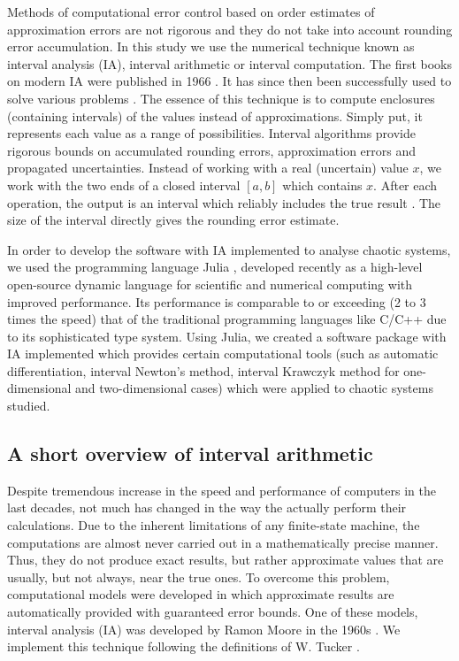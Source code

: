 \documentclass[pre, amsmath, amssymb, onecolumn, showpacs]{revtex4-1}
\begin{document}
Methods of computational error control based on order estimates of approximation errors are not rigorous and they do not take into account rounding error accumulation. In this study we use the numerical technique known as interval analysis (IA), interval arithmetic or interval computation. The first books on modern IA were published in 1966 \cite{moore1966interval, moore2009introduction}. It has since then been successfully used to solve various problems \cite{zuhe1990solving, schichl2005interval}. The essence of this technique is to compute enclosures (containing intervals) of the values instead of approximations. Simply put, it represents each value as a range of possibilities. Interval algorithms provide rigorous bounds on accumulated rounding errors, approximation errors and propagated uncertainties. Instead of working with a real (uncertain) value $x$, we work with the two ends of a closed interval $[a, b]$ which contains $x$. After each operation, the output is an interval which reliably includes the true result \cite{tucker2011validated, moore2009introduction}. The size of the interval directly gives the rounding error estimate.

In order to develop the software with IA implemented to analyse chaotic systems, we used the programming language Julia \cite{JuliaArticle}, developed recently as a high-level open-source dynamic language for scientific and numerical computing with improved performance. Its performance is comparable to or exceeding (2 to 3 times the speed) that of the traditional programming languages like C/C++ due to its sophisticated type system. Using Julia, we created a software package with IA implemented which provides certain computational tools (such as automatic differentiation, interval Newton's method, interval Krawczyk method for one-dimensional and two-dimensional cases) which were applied to chaotic systems studied.


\subsection{A short overview of interval arithmetic}

Despite tremendous increase in the speed and performance of computers in the last decades, not much has changed in the way the actually perform their calculations. Due to the inherent limitations of any finite-state machine, the computations are almost never carried out in a mathematically precise manner. Thus, they do not produce exact results, but rather approximate values that are usually, but not always, near the true ones. To overcome this problem, computational models were developed in which approximate results are automatically provided with guaranteed error bounds. One of these models, interval analysis (IA) was developed by Ramon Moore in the 1960s \cite{moore1966interval}. We implement this technique following the definitions of W. Tucker \cite{tucker2011validated}.
\end{document}
